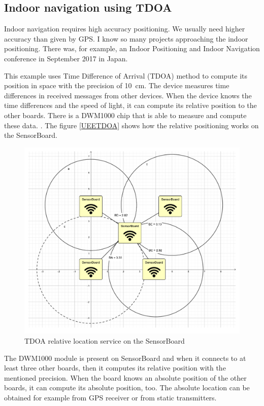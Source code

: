 \subsection{Indoor navigation using TDOA}
Indoor navigation requires high accuracy positioning. We usually need higher accuracy than given by GPS. I know so many projects approaching the indoor positioning. There was, for example, an Indoor Positioning and Indoor Navigation conference in September 2017 in Japan.

This example uses Time Difference of Arrival (TDOA) method to compute its position in space with the precision of \SI{10}{cm}. The device measures time differences in received messages from other devices. When the device knows the time differences and the speed of light, it can compute its relative position to the other boards. There is a DWM1000 chip that is able to measure and compute these data. \cite{decawave:DWM1000}. The figure \ref{UEETDOA} shows how the relative positioning works on the SensorBoard.

\begin{figure}[H]
	\centering
	\label{UETDOA}
	\caption{TDOA relative location service on the SensorBoard}
	\includegraphics[trim=5cm 6cm 5cm 5cm, clip, width=16cm]{img/UsageExamplesTDOA.pdf}
\end{figure}

The DWM1000 \cite{decawave:DWM1000} module is present on SensorBoard and when it connects to at least three other boards, then it computes its relative position with the mentioned precision. When the board knows an absolute position of the other boards, it can compute its absolute position, too. The absolute location can be obtained for example from GPS receiver or from static transmitters.


